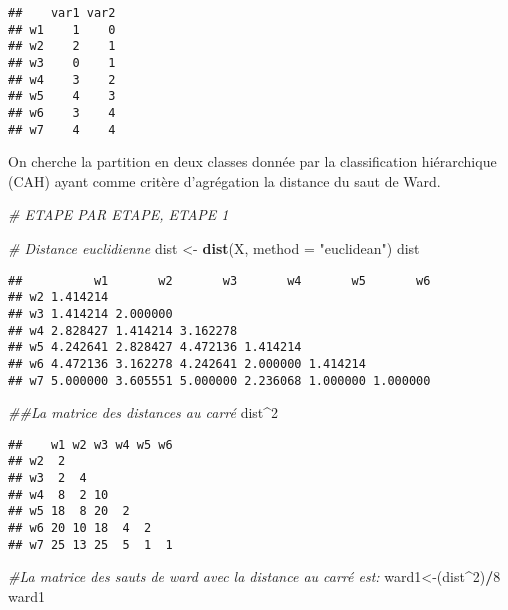 \documentclass[
]{article}
\newenvironment{Shaded}{\begin{snugshade}}{\end{snugshade}}
\newcommand{\CommentTok}[1]{\textcolor[rgb]{0.56,0.35,0.01}{\textit{#1}}}
\newcommand{\DataTypeTok}[1]{\textcolor[rgb]{0.13,0.29,0.53}{#1}}
\newcommand{\DecValTok}[1]{\textcolor[rgb]{0.00,0.00,0.81}{#1}}
\newcommand{\KeywordTok}[1]{\textcolor[rgb]{0.13,0.29,0.53}{\textbf{#1}}}
\newcommand{\NormalTok}[1]{#1}
\newcommand{\OperatorTok}[1]{\textcolor[rgb]{0.81,0.36,0.00}{\textbf{#1}}}
\newcommand{\StringTok}[1]{\textcolor[rgb]{0.31,0.60,0.02}{#1}}
\begin{document}
\begin{verbatim}
##    var1 var2
## w1    1    0
## w2    2    1
## w3    0    1
## w4    3    2
## w5    4    3
## w6    3    4
## w7    4    4
\end{verbatim}

On cherche la partition en deux classes donnée par la classification
hiérarchique (CAH) ayant comme critère d'agrégation la distance du saut
de Ward.

\begin{Shaded}
\begin{Highlighting}[]
\CommentTok{# ETAPE PAR ETAPE, ETAPE 1}


\CommentTok{# Distance euclidienne}
\NormalTok{dist <-}\StringTok{ }\KeywordTok{dist}\NormalTok{(X, }\DataTypeTok{method =} \StringTok{"euclidean"}\NormalTok{)}
\NormalTok{dist}
\end{Highlighting}
\end{Shaded}

\begin{verbatim}
##          w1       w2       w3       w4       w5       w6
## w2 1.414214                                             
## w3 1.414214 2.000000                                    
## w4 2.828427 1.414214 3.162278                           
## w5 4.242641 2.828427 4.472136 1.414214                  
## w6 4.472136 3.162278 4.242641 2.000000 1.414214         
## w7 5.000000 3.605551 5.000000 2.236068 1.000000 1.000000
\end{verbatim}

\begin{Shaded}
\begin{Highlighting}[]
\CommentTok{##La matrice des distances au carré}
\NormalTok{dist}\OperatorTok{^}\DecValTok{2}
\end{Highlighting}
\end{Shaded}

\begin{verbatim}
##    w1 w2 w3 w4 w5 w6
## w2  2               
## w3  2  4            
## w4  8  2 10         
## w5 18  8 20  2      
## w6 20 10 18  4  2   
## w7 25 13 25  5  1  1
\end{verbatim}

\begin{Shaded}
\begin{Highlighting}[]
\CommentTok{#La matrice des sauts de ward avec la distance au carré est:}
\NormalTok{ward1<-(dist}\OperatorTok{^}\DecValTok{2}\NormalTok{)}\OperatorTok{/}\DecValTok{8}
\NormalTok{ward1}
\end{Highlighting}
\end{Shaded}
\end{document}
